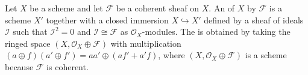Let $X$ be a scheme and let $\mathcal{F}$ be a coherent sheaf on $X$. An  of $X$ by $\mathcal{F}$ is a scheme $X'$ together with a closed immersion $X \hookrightarrow X'$ defined by a sheaf of ideals $\mathcal{I}$ such that $\mathcal{I}^2 = 0$ and $\mathcal{I} \cong \mathcal{F}$ as $\mathcal{O}_X$-modules. The  is obtained by taking the ringed space $(X, \mathcal{O}_X \oplus \mathcal{F})$ with multiplication $(a \oplus f)(a' \oplus f') = aa' \oplus (af' + a'f)$, where $(X, \mathcal{O}_X \oplus \mathcal{F})$ is a scheme because $\mathcal{F}$ is coherent.
